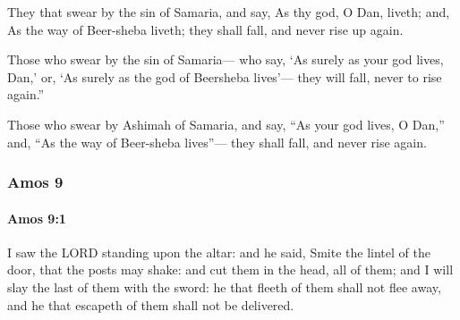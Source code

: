 			\begin{versebox}
					\item[BHS] 
					\item[LXX] 
					\item[ASV] They that swear by the sin of Samaria, and say, As thy god, O Dan, liveth; and, As the way of Beer-sheba liveth; they shall fall, and never rise up again.
					\item[NIV] Those who swear by the sin of Samaria— who say, ‘As surely as your god lives, Dan,’ or, ‘As surely as the god of Beersheba lives’— they will fall, never to rise again.”
					\item[NRSV] Those who swear by Ashimah of Samaria, and say, “As your god lives, O Dan,” and, “As the way of Beer-sheba lives”— they shall fall, and never rise again.
			\end{versebox}
	\subsubsection{Amos 9} %
		\label{AMOS-9}

		\paragraph{Amos 9:1} %
			\label{AMOS-9-1}

			I saw the LORD standing upon the altar: and he said, Smite the lintel of the door, that the posts may shake: and cut them in the head, all of them; and I will slay the last of them with the sword: he that fleeth of them shall not flee away, and he that escapeth of them shall not be delivered.

